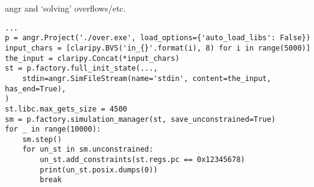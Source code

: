 \begin{frame}[fragile]{angr and `solving' overflows/etc.}
\begin{Verbatim}[fontsize=\fontsize{8}{9}]
...
p = angr.Project('./over.exe', load_options={'auto_load_libs': False})
input_chars = [claripy.BVS('in_{}'.format(i), 8) for i in range(5000)]
the_input = claripy.Concat(*input_chars)
st = p.factory.full_init_state(...,
    stdin=angr.SimFileStream(name='stdin', content=the_input, has_end=True),
)
st.libc.max_gets_size = 4500
sm = p.factory.simulation_manager(st, save_unconstrained=True)
for _ in range(10000):
    sm.step()
    for un_st in sm.unconstrained:
        un_st.add_constraints(st.regs.pc == 0x12345678)
        print(un_st.posix.dumps(0))
        break
\end{Verbatim}
\end{frame}
